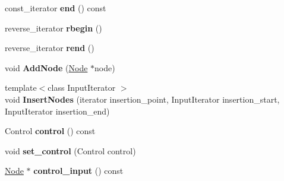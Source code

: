 \begin{DoxyCompactItemize}
\item 
const\+\_\+iterator {\bfseries end} () const \hypertarget{classv8_1_1internal_1_1compiler_1_1_basic_block_a5739cf9cb059860a82a771b86c78c25f}{}\label{classv8_1_1internal_1_1compiler_1_1_basic_block_a5739cf9cb059860a82a771b86c78c25f}

\item 
reverse\+\_\+iterator {\bfseries rbegin} ()\hypertarget{classv8_1_1internal_1_1compiler_1_1_basic_block_a0e1862e1dc2f849b2be552b4ef3344b8}{}\label{classv8_1_1internal_1_1compiler_1_1_basic_block_a0e1862e1dc2f849b2be552b4ef3344b8}

\item 
reverse\+\_\+iterator {\bfseries rend} ()\hypertarget{classv8_1_1internal_1_1compiler_1_1_basic_block_ad1aea0c78564098e4f9badfe96baf4bd}{}\label{classv8_1_1internal_1_1compiler_1_1_basic_block_ad1aea0c78564098e4f9badfe96baf4bd}

\item 
void {\bfseries Add\+Node} (\hyperlink{classv8_1_1internal_1_1compiler_1_1_node}{Node} $\ast$node)\hypertarget{classv8_1_1internal_1_1compiler_1_1_basic_block_a7f6e2222fc8c1b4a8e66294c6702dd2c}{}\label{classv8_1_1internal_1_1compiler_1_1_basic_block_a7f6e2222fc8c1b4a8e66294c6702dd2c}

\item 
{\footnotesize template$<$class Input\+Iterator $>$ }\\void {\bfseries Insert\+Nodes} (iterator insertion\+\_\+point, Input\+Iterator insertion\+\_\+start, Input\+Iterator insertion\+\_\+end)\hypertarget{classv8_1_1internal_1_1compiler_1_1_basic_block_ad664af67c0a8d3eb3b1199ec644c885a}{}\label{classv8_1_1internal_1_1compiler_1_1_basic_block_ad664af67c0a8d3eb3b1199ec644c885a}

\item 
Control {\bfseries control} () const \hypertarget{classv8_1_1internal_1_1compiler_1_1_basic_block_a0dded63fdec8ba990384aa00f11465b2}{}\label{classv8_1_1internal_1_1compiler_1_1_basic_block_a0dded63fdec8ba990384aa00f11465b2}

\item 
void {\bfseries set\+\_\+control} (Control control)\hypertarget{classv8_1_1internal_1_1compiler_1_1_basic_block_a701028f03924fab40523d6e7393a2c7c}{}\label{classv8_1_1internal_1_1compiler_1_1_basic_block_a701028f03924fab40523d6e7393a2c7c}

\item 
\hyperlink{classv8_1_1internal_1_1compiler_1_1_node}{Node} $\ast$ {\bfseries control\+\_\+input} () const \hypertarget{classv8_1_1internal_1_1compiler_1_1_basic_block_ab224afde73bba006710c02603a605335}{}\label{classv8_1_1internal_1_1compiler_1_1_basic_block_ab224afde73bba006710c02603a605335}


\end{DoxyCompactItemize}
